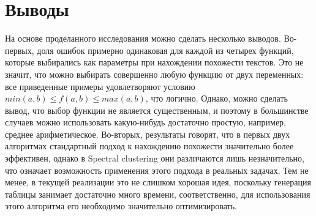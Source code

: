 \section{Выводы}
На основе проделанного исследования можно сделать несколько выводов. \newline
Во-первых, доля ошибок примерно одинаковая для каждой из четырех функций, которые выбирались как параметры при нахождении похожести текстов. Это не значит, что можно выбирать совершенно любую функцию от двух переменных: все приведенные примеры удовлетворяют условию $min(a, b) \leq f(a, b) \leq max(a, b)$, что логично. Однако, можно сделать вывод, что выбор функции не является существенным, и поэтому в большинстве случаев можно использовать какую-нибудь достаточно простую, например, среднее арифметическое. \newline
Во-вторых, результаты говорят, что в первых двух алгоритмах стандартный подход к нахождению похожести значительно более эффективен, однако в Spectral clustering они различаются лишь незначительно, что означает возможность применения этого подхода в реальных задачах. Тем не менее, в текущей реализации это не слишком хорошая идея, поскольку генерация таблицы занимает достаточно много времени, соответственно, для использования этого алгоритма его необходимо значительно оптимизировать. \newline